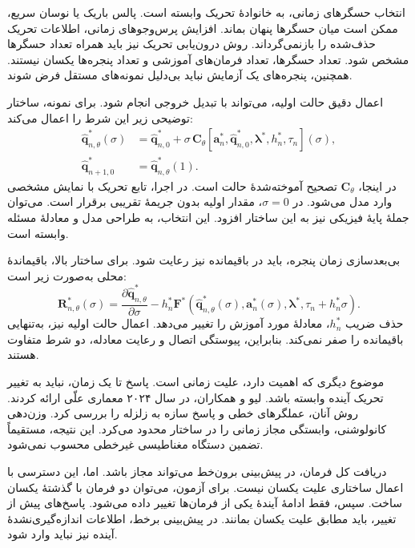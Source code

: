 انتخاب حسگرهای زمانی، به خانوادهٔ تحریک وابسته است.
پالس باریک یا نوسان سریع، ممکن است میان حسگرها پنهان بماند.
افزایش پرس‌وجوهای زمانی، اطلاعات تحریک حذف‌شده را بازنمی‌گرداند.
روش درون‌یابی تحریک نیز باید همراه تعداد حسگرها مشخص شود.
تعداد حسگرها، تعداد فرمان‌های آموزشی و تعداد پنجره‌ها یکسان نیستند.
همچنین، پنجره‌های یک آزمایش نباید بی‌دلیل نمونه‌های مستقل فرض شوند.

اعمال دقیق حالت اولیه، می‌تواند با تبدیل خروجی انجام شود.
برای نمونه، ساختار توضیحی زیر این شرط را اعمال می‌کند:
\begin{equation}
\begin{aligned}
\widehat{\mathbf{q}}^{*}_{n,\theta}(\sigma)
&=\widehat{\mathbf{q}}^{*}_{n,0}
+\sigma\,\mathbf{C}_{\theta}
\left[\mathbf{a}^{*}_{n},\widehat{\mathbf{q}}^{*}_{n,0},
\boldsymbol{\lambda}^{*},h_n^{*},\tau_n\right](\sigma),\\
\widehat{\mathbf{q}}^{*}_{n+1,0}
&=\widehat{\mathbf{q}}^{*}_{n,\theta}(1).
\end{aligned}
\label{eq:lit-temporal-initial-transform}
\end{equation}
در اینجا، $\mathbf{C}_{\theta}$ تصحیح آموخته‌شدهٔ حالت است.
در اجرا، تابع تحریک با نمایش مشخصی وارد مدل می‌شود.
در $\sigma=0$، مقدار اولیه بدون جریمهٔ تقریبی برقرار است.
می‌توان جملهٔ پایهٔ فیزیکی نیز به این ساختار افزود.
این انتخاب، به طراحی مدل و معادلهٔ مسئله وابسته است.

بی‌بعدسازی زمان پنجره، باید در باقیمانده نیز رعایت شود.
برای ساختار بالا، باقیماندهٔ محلی به‌صورت زیر است:
\begin{equation}
\mathbf{R}^{*}_{n,\theta}(\sigma)
=\frac{\partial\widehat{\mathbf{q}}^{*}_{n,\theta}}{\partial\sigma}
-h_n^{*}\mathbf{F}^{*}\!\left(
\widehat{\mathbf{q}}^{*}_{n,\theta}(\sigma),
\mathbf{a}^{*}_{n}(\sigma),\boldsymbol{\lambda}^{*},
\tau_n+h_n^{*}\sigma\right).
\label{eq:lit-temporal-window-residual}
\end{equation}
حذف ضریب $h_n^{*}$، معادلهٔ مورد آموزش را تغییر می‌دهد.
اعمال حالت اولیه نیز، به‌تنهایی باقیمانده را صفر نمی‌کند.
بنابراین، پیوستگی اتصال و رعایت معادله، دو شرط متفاوت هستند.

موضوع دیگری که اهمیت دارد، علیت زمانی است.
پاسخ تا یک زمان، نباید به تغییر تحریک آینده وابسته باشد.
لیو و همکاران، در سال ۲۰۲۴ معماری علّی ارائه کردند.
روش آنان، عملگرهای خطی و پاسخ سازه به زلزله را بررسی کرد.
وزن‌دهی کانولوشنی، وابستگی مجاز زمانی را در ساختار محدود می‌کرد.
این نتیجه، مستقیماً تضمین دستگاه مغناطیسی غیرخطی محسوب نمی‌شود.
\cite{Liu2024Causality}

دریافت کل فرمان، در پیش‌بینی برون‌خط می‌تواند مجاز باشد.
اما، این دسترسی با اعمال ساختاری علیت یکسان نیست.
برای آزمون، می‌توان دو فرمان با گذشتهٔ یکسان ساخت.
سپس، فقط ادامهٔ آیندهٔ یکی از فرمان‌ها تغییر داده می‌شود.
پاسخ‌های پیش از تغییر، باید مطابق علیت یکسان بمانند.
در پیش‌بینی برخط، اطلاعات اندازه‌گیری‌نشدهٔ آینده نیز نباید وارد شود.

